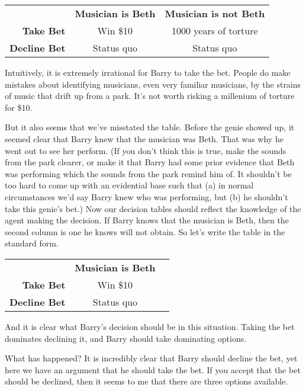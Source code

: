 \documentclass[11pt,oneside]{book}
\begin{document}
\begin{center}
\begin{tabular}{r c c}
 & \textbf{Musician is Beth} & \textbf{Musician is not Beth} \\
\textbf{Take Bet} & Win \$10 & 1000 years of torture \\
\textbf{Decline Bet} & Status quo & Status quo \\
\end{tabular}
\end{center}

\noindent Intuitively, it is extremely irrational for Barry to take the bet. People do make mistakes about identifying musicians, even very familiar musicians, by the strains of music that drift up from a park. It's not worth risking a millenium of torture for \$10.

But it also seems that we've misstated the table. Before the genie showed up, it seemed clear that Barry knew that the musician was Beth. That was why he went out to see her perform. (If you don't think this is true, make the sounds from the park clearer, or make it that Barry had some prior evidence that Beth was performing which the sounds from the park remind him of. It shouldn't be too hard to come up with an evidential base such that (a) in normal circumstances we'd say Barry knew who was performing, but (b) he shouldn't take this genie's bet.) Now our decision tables should reflect the knowledge of the agent making the decision. If Barry knows that the musician is Beth, then the second column is one he knows will not obtain. So let's write the table in the standard form.

\begin{center}
\begin{tabular}{r c c}
 & \textbf{Musician is Beth} &  \\
\textbf{Take Bet} & Win \$10  \\
\textbf{Decline Bet} & Status quo &  \\
\end{tabular}
\end{center}

\noindent And it is clear what Barry's decision should be in this situation. Taking the bet dominates declining it, and Barry should take dominating options.

What has happened? It is incredibly clear that Barry should decline the bet, yet here we have an argument that he should take the bet. If you accept that the bet should be declined, then it seems to me that there are three options available.
\end{document}
